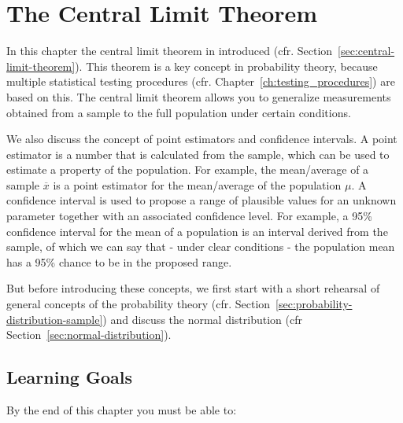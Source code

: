 \chapter{The Central Limit Theorem}
\label{ch:central-limit-theorem}

In this chapter the central limit theorem in introduced (cfr. Section~\ref{sec:central-limit-theorem}). This theorem is a key concept in probability theory, because multiple statistical testing procedures (cfr. Chapter~\ref{ch:testing_procedures}) are based on this. The central limit theorem allows you to generalize measurements obtained from a sample to the full population under certain conditions.

We also discuss the concept of point estimators and confidence intervals. A point estimator is a number that is calculated from the sample, which can be used to estimate a property of the population. For example, the mean/average of a sample $\overline{x}$ is a point estimator for the mean/average of the population $\mu$. A confidence interval is used to propose a range of plausible values for an unknown parameter together with an associated confidence level. For example, a 95\% confidence interval for the mean of a population is an interval derived from the sample, of which we can say that - under clear conditions - the population mean has a 95\% chance to be in the proposed range.

But before introducing these concepts, we first start with a short rehearsal of general concepts of the probability theory (cfr. Section~\ref{sec:probability-distribution-sample}) and discuss the normal distribution (cfr Section~\ref{sec:normal-distribution}).

\section{Learning Goals}
\label{sec:central-limit-theorem-learning-goals}

By the end of this chapter you must be able to:

